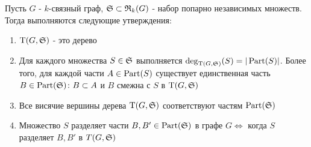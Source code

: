 \begin{customthm}{1.1} \label{theorem:1_1}
	Пусть $G$ -  $k$-связный граф, $\S \subset \R_k(G)$ - набор попарно независимых множеств.
	Тогда выполняются следующие утверждения:

	 \begin{enumerate}
		 \item $\wT(G, \S)$ - это дерево \label{stmt:theorem_1_1_1}
		 \item Для каждого множества $S \in \S$ выполняется  $\deg_{\wT(G, \S)}(S) = |\Part(S)|$.
			 Более того, для каждой части  $A \in \Part(S)$ существует единственная часть  $B \in \Part(\S) \colon B \subset A$ и  $B$ смежна с  $S$ в  $\wT(G, \S)$ \label{stmt:theorem_1_1_2}
		 \item Все висячие вершины дерева  $\wT(G, \S)$ соответствуют частям  $\Part(\S)$ \label{stmt:theorem_1_1_3}
		 \item Множество  $S$ разделяет части  $B, B' \in \Part(\S)$ в графе  $G \iff$ когда  $S$ разделяет  $B, B'$ в  $T(G, \S)$ \label{stmt:theorem_1_1_4}
	\end{enumerate}
	
\end{customthm}

